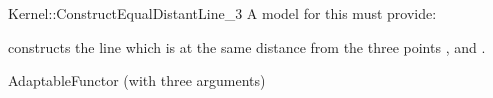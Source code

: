 \begin{ccRefFunctionObjectConcept}{Kernel::ConstructEqualDistantLine_3}
A model for this must provide:


{constructs the line which is at the same distance from the three points
,  and .
}

\ccRefines
AdaptableFunctor (with three arguments)

\ccSeeAlso
{}

\end{ccRefFunctionObjectConcept}
